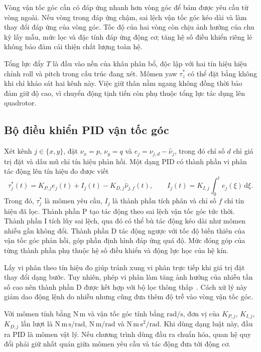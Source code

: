 Vòng vận tốc góc cần có đáp ứng nhanh hơn vòng góc để bám được yêu cầu từ vòng ngoài. Nếu vòng trong đáp ứng chậm, sai lệch vận tốc góc kéo dài và làm thay đổi đáp ứng của vòng góc. Tốc độ của hai vòng còn chịu ảnh hưởng của chu kỳ lấy mẫu, mức lọc và đặc tính đáp ứng động cơ; tăng hệ số điều khiển riêng lẻ không bảo đảm cải thiện chất lượng toàn hệ.

Tổng lực đẩy $T$ là đầu vào nền của khâu phân bổ, độc lập với hai tín hiệu hiệu chỉnh roll và pitch trong cấu trúc đang xét. Mômen yaw $\tau_z^*$ có thể đặt bằng không khi chỉ khảo sát hai kênh này. Việc giữ thân nằm ngang không đồng thời bảo đảm giữ độ cao, vì chuyển động tịnh tiến còn phụ thuộc tổng lực tác dụng lên quadrotor.

\subsection{Bộ điều khiển PID vận tốc góc}

Xét kênh $j\in\{x,y\}$, đặt $\nu_x=p$, $\nu_y=q$ và $e_j=\nu_{j,d}-\hat\nu_j$, trong đó chỉ số $d$ chỉ giá trị đặt và dấu mũ chỉ tín hiệu phản hồi. Một dạng PID có thành phần vi phân tác động lên tín hiệu đo được viết
\begin{equation}
    \tau_j^*(t)=K_{P,j}e_j(t)+I_j(t)-K_{D,j}\dot{\hat\nu}_{j,f}(t),
    \qquad I_j(t)=K_{I,j}\int_0^t e_j(\xi)\,\mathrm d\xi.
    \label{eq:background-rate-pid}
\end{equation}
Trong đó, $\tau_j^*$ là mômen yêu cầu, $I_j$ là thành phần tích phân và chỉ số $f$ chỉ tín hiệu đã lọc. Thành phần P tạo tác động theo sai lệch vận tốc góc tức thời. Thành phần I tích lũy sai lệch, qua đó có thể bù tác động kéo dài như mômen nhiễu gần không đổi. Thành phần D tác động ngược với tốc độ biến thiên của vận tốc góc phản hồi, góp phần định hình đáp ứng quá độ. Mức đóng góp của từng thành phần phụ thuộc hệ số điều khiển và động lực học của hệ kín.

Lấy vi phân theo tín hiệu đo giúp tránh xung vi phân trực tiếp khi giá trị đặt thay đổi dạng bước. Tuy nhiên, phép vi phân làm tăng ảnh hưởng của nhiễu tần số cao nên thành phần D được kết hợp với bộ lọc thông thấp~\cite{astrom2021feedback}. Cách xử lý này giảm dao động lệnh do nhiễu nhưng cũng đưa thêm độ trễ vào vòng vận tốc góc.

Với mômen tính bằng $\mathrm{N\,m}$ và vận tốc góc tính bằng $\mathrm{rad/s}$, đơn vị của $K_{P,j}$, $K_{I,j}$, $K_{D,j}$ lần lượt là $\mathrm{N\,m\,s/rad}$, $\mathrm{N\,m/rad}$ và $\mathrm{N\,m\,s^2/rad}$. Khi dùng dạng luật này, đầu ra PID là mômen vật lý. Nếu chương trình dùng đầu ra chuẩn hóa, quan hệ quy đổi phải giữ nhất quán giữa mômen yêu cầu và tác động đưa tới động cơ.
